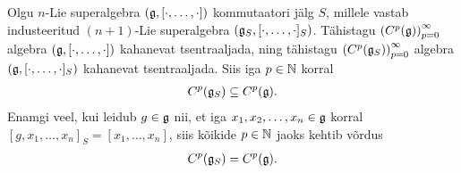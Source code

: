 \begin{lau}
    Olgu $n$-Lie superalgebra $(\mathfrak{g}, [\cdot, \dots, \cdot])$
    kommutaatori jälg $S$, millele vastab industeeritud
    $(n+1)$-Lie superalgebra $(\mathfrak{g}_S, [\cdot, \dots, \cdot]_S)$.
    Tähistagu $\left(C^p(\mathfrak{g})\right)_{p=0}^\infty$ algebra
    $(\mathfrak{g}, [\cdot, \dots, \cdot])$
    kahanevat tsentraaljada, ning tähistagu
    $\left(C^p(\mathfrak{g}_S)\right)_{p=0}^\infty$ algebra
    $(\mathfrak{g}, [\cdot, \dots, \cdot]_S)$
    kahanevat tsentraaljada. Siis iga $p \in \mathbb{N}$ korral
    \begin{align*}
        C^p(\mathfrak{g}_S) \subseteq C^p(\mathfrak{g}).
    \end{align*}
    Enamgi veel, kui leidub $g \in \mathfrak{g}$ nii, et iga
    $x_1, x_2, \dots, x_n \in \mathfrak{g}$ korral
    $[g, x_1, \dots, x_n]_S = [x_1, \dots, x_n]$, siis
    kõikide $p \in \mathbb{N}$ jaoks kehtib võrdus
    \begin{align*}
        C^p(\mathfrak{g}_S) = C^p(\mathfrak{g}).
    \end{align*}
\end{lau}

